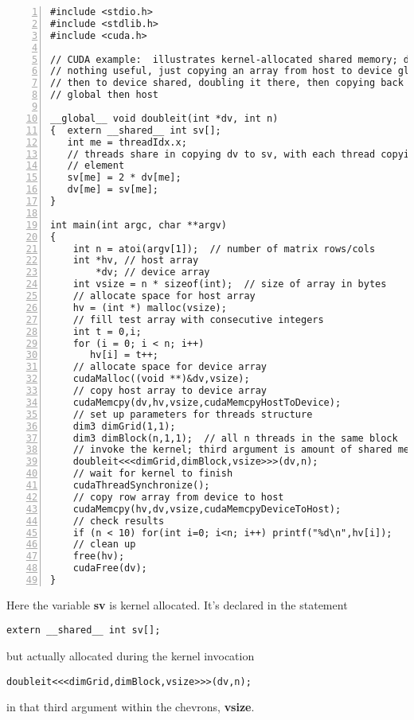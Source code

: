 \begin{lstlisting}[numbers=left]
#include <stdio.h>
#include <stdlib.h>
#include <cuda.h>

// CUDA example:  illustrates kernel-allocated shared memory; does
// nothing useful, just copying an array from host to device global,
// then to device shared, doubling it there, then copying back to device
// global then host

__global__ void doubleit(int *dv, int n)
{  extern __shared__ int sv[];
   int me = threadIdx.x;  
   // threads share in copying dv to sv, with each thread copying one
   // element
   sv[me] = 2 * dv[me];
   dv[me] = sv[me];
}

int main(int argc, char **argv)
{
    int n = atoi(argv[1]);  // number of matrix rows/cols
    int *hv, // host array
        *dv; // device array
    int vsize = n * sizeof(int);  // size of array in bytes
    // allocate space for host array
    hv = (int *) malloc(vsize);  
    // fill test array with consecutive integers
    int t = 0,i;
    for (i = 0; i < n; i++) 
       hv[i] = t++;
    // allocate space for device array 
    cudaMalloc((void **)&dv,vsize);
    // copy host array to device array
    cudaMemcpy(dv,hv,vsize,cudaMemcpyHostToDevice);
    // set up parameters for threads structure
    dim3 dimGrid(1,1);
    dim3 dimBlock(n,1,1);  // all n threads in the same block
    // invoke the kernel; third argument is amount of shared memory
    doubleit<<<dimGrid,dimBlock,vsize>>>(dv,n);
    // wait for kernel to finish
    cudaThreadSynchronize();
    // copy row array from device to host
    cudaMemcpy(hv,dv,vsize,cudaMemcpyDeviceToHost);
    // check results
    if (n < 10) for(int i=0; i<n; i++) printf("%d\n",hv[i]);
    // clean up
    free(hv);
    cudaFree(dv);
}
\end{lstlisting}

Here the variable {\bf sv} is kernel allocated.  It's declared in
the statement

\begin{Verbatim}[fontsize=\relsize{-2}]
extern __shared__ int sv[];
\end{Verbatim}

but actually allocated during the kernel invocation

\begin{Verbatim}[fontsize=\relsize{-2}]
doubleit<<<dimGrid,dimBlock,vsize>>>(dv,n);
\end{Verbatim}

in that third argument within the chevrons, {\bf vsize}.

